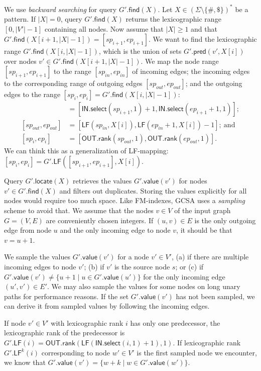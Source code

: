 \documentclass[a4paper,11pt]{llncs}
\newcommand{\set}[1]{\ensuremath{\{ #1 \}}}
\newcommand{\abs}[1]{\ensuremath{\lvert #1 \rvert}}
\newcommand{\rank}{\ensuremath{\mathsf{rank}}}
\newcommand{\select}{\ensuremath{\mathsf{select}}}
\newcommand{\LF}{\ensuremath{\mathsf{LF}}}
\newcommand{\find}{\ensuremath{\mathsf{find}}}
\newcommand{\locate}{\ensuremath{\mathsf{locate}}}
\newcommand{\gpred}{\ensuremath{\mathsf{pred}}}
\newcommand{\gvalue}{\ensuremath{\mathsf{value}}}
\newcommand{\LFmapping}{LF\nobreakdash-mapping}
\newcommand{\patternset}{\ensuremath{(\Sigma \setminus \set{\#, \$})^{\ast}}}
\newcommand{\bvIN}{\ensuremath{\mathsf{IN}}}
\newcommand{\bvOUT}{\ensuremath{\mathsf{OUT}}}
\begin{document}
We use \emph{backward searching} for query $G'.\find(X)$. Let $X \in \patternset$ be a pattern. If $\abs{X} = 0$, query $G'.\find(X)$ returns the lexicographic range $[0, \abs{V'}-1]$ containing all nodes. Now assume that $\abs{X} \ge 1$ and that $G'.\find(X[i+1, \abs{X}-1]) = [sp_{i+1}, ep_{i+1}]$. We want to find the lexicographic range $G'.\find(X[i, \abs{X}-1])$, which is the union of sets $G'.\gpred(v', X[i])$ over nodes $v' \in G'.\find(X[i+1, \abs{X}-1])$. We map the node range $[sp_{i+1}, ep_{i+1}]$ to the range $[sp_{in}, ep_{in}]$ of incoming edges; the incoming edges to the corresponding range of outgoing edges $[sp_{out}, ep_{out}]$; and the outgoing edges to the range $[sp_{i}, ep_{i}] = G'.\find(X[i, \abs{X}-1])$:
\begin{align*}
[sp_{in}, ep_{in}] & = [\bvIN.\select(sp_{i+1}, 1) + 1, \bvIN.\select(ep_{i+1}+1, 1)]; \\
[sp_{out}, ep_{out}] & = [\LF(sp_{in}, X[i]), \LF(ep_{in}+1, X[i]) - 1];\ \textrm{and} \\
[sp_{i}, ep_{i}] & = [\bvOUT.\rank(sp_{out}, 1), \bvOUT.\rank(ep_{out}, 1)].
\end{align*}
We can think this as a generalization of \LFmapping: $[sp_{i}, ep_{i}] = G'.\LF([sp_{i+1}, ep_{i+1}], X[i])$.

Query $G'.\locate(X)$ retrieves the values $G'.\gvalue(v')$ for nodes $v' \in G'.\find(X)$ and filters out duplicates. Storing the values explicitly for all nodes would require too much space. Like FM\nobreakdash-indexes, GCSA uses a \emph{sampling} scheme to avoid that. We assume that the nodes $v \in V$ of the input graph $G = (V, E)$ are conveniently chosen integers. If $(u, v) \in E$ is the only outgoing edge from node $u$ and the only incoming edge to node $v$, it should be that $v = u+1$.

We sample the values $G'.\gvalue(v')$ for a node $v' \in V'$, (a) if there are multiple incoming edges to node $v'$; (b) if $v'$ is the source node $s$; or (c) if $G'.\gvalue(v') \ne \set{u+1 \mid u \in G'.\gvalue(u')}$ for the only incoming edge $(u', v') \in E'$. We may also sample the values for some nodes on long unary paths for performance reasons. If the set $G'.\gvalue(v')$ has not been sampled, we can derive it from sampled values by following the incoming edges.

If node $v' \in V'$ with lexicographic rank $i$ has only one predecessor, the lexicographic rank of the predecessor is $G'.\LF(i) = \bvOUT.\rank(\LF(\bvIN.\select(i, 1) + 1), 1)$. If lexicographic rank $G'.\LF^{k}(i)$ corresponding to node $w' \in V'$ is the first sampled node we encounter, we know that $G'.\gvalue(v') = \set{w+k \mid w \in G'.\gvalue(w')}$.
\end{document}
